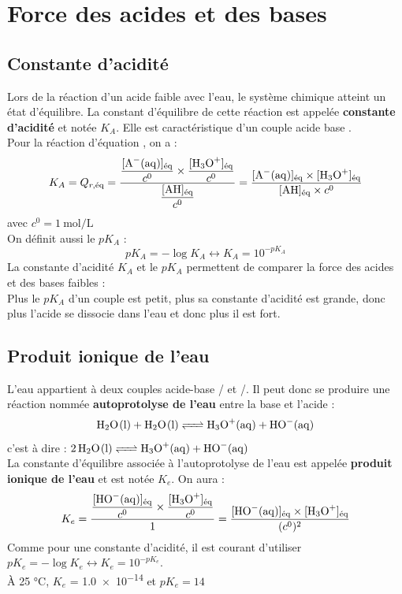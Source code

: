 \documentclass[a4paper,11pt,fleqn]{article}%
\begin{document}
\section{Force des acides et des bases}
	\subsection{Constante d'acidité}
	Lors de la réaction d'un acide faible avec l'eau, le système chimique atteint un état d'équilibre. La constant d'équilibre de cette réaction est appelée \textbf{constante d'acidité} et notée $K_A$. Elle est caractéristique d'un couple acide base .\\
	Pour la réaction d'équation , on a :
	$$K_A = Q_{r,\text{éq}} = \dfrac{\dfrac{[\ce{A-(aq)}]_{\text{éq}}}{c^0} \times \dfrac{[\ce{H3O+}]_{\text{éq}}}{c^0}}{\dfrac{[\ce{AH}]_{\text{éq}}}{c^0}} = \dfrac{[\ce{A-(aq)}]_\text{éq} \times [\ce{H3O+}]_{\text{éq}}}{[\ce{AH}]_{\text{éq}} \times c^0} \nonumber$$
	avec $c^0 = \SI{1}{\mole \per \liter}$\\
	On définit aussi le $pK_A$ :
	$$pK_A = - \log{K_A} \leftrightarrow K_A = 10^{-pK_A}$$
	La constante d'acidité $K_A$ et le $pK_A$ permettent de comparer la force des acides et des bases faibles : \\
	Plus le $pK_A$ d'un couple est petit, plus sa constante d'acidité est grande, donc plus l'acide se dissocie dans l'eau et donc plus il est fort.
	\subsection{Produit ionique de l'eau}
	L'eau appartient à deux couples acide-base  /  et /. Il peut donc se produire une réaction nommée \textbf{autoprotolyse de l'eau} entre la base  et l'acide  :
$$\ce{H2O(l) + H2O(l) <=> H3O+(aq) + HO-(aq)}$$
c'est à dire : $ \ce{2 H2O(l)}\ce{<=> H3O+(aq) + HO-(aq)}$\\
La constante d'équilibre associée à l'autoprotolyse de l'eau est appelée \textbf{produit ionique de l'eau} et est notée $K_e$. On aura :
$$K_e = \dfrac{\dfrac{[\ce{HO-(aq)}]_{\text{éq}}}{c^0} \times \dfrac{[\ce{H3O+}]_{\text{éq}}}{c^0}}{1} = \dfrac{[\ce{HO-(aq)}]_{\text{éq}} \times [\ce{H3O+}]_{\text{éq}}}{(c^0)^2}$$
Comme pour une constante d'acidité, il est courant d'utiliser $pK_e = -\log{K_e} \leftrightarrow K_e = 10^{-pK_e}$.\\
À \num{25} \unit{\celsius}, $K_e$ = \num{1,0e-14} et $pK_e = 14$
\end{document}
